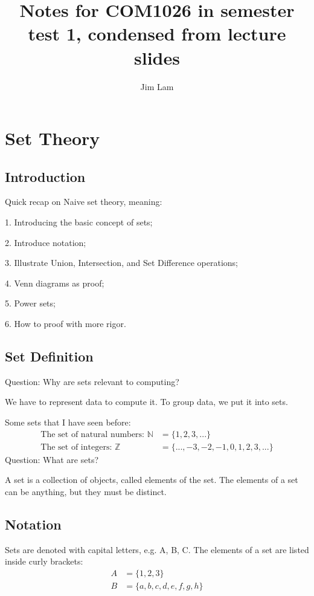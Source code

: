 \documentclass{article}
\author{Jim Lam}
\begin{document}
\title{Notes for COM1026 in semester test 1, condensed from lecture slides}
\maketitle
\tableofcontents
\section{Set Theory}

\subsection{Introduction}
Quick recap on Naive set theory, meaning:

1. Introducing the basic concept of sets;

2. Introduce notation;

3. Illustrate Union, Intersection, and Set Difference operations;

4. Venn diagrams as proof;

5. Power sets;

6. How to proof with more rigor.

\subsection{Set Definition}

Question: Why are sets relevant to computing?

We have to represent data to compute it.
To group data, we put it into sets.

Some sets that I have seen before:
\begin{align*}
    \text{The set of natural numbers: } \mathbb{N} & = \{1, 2, 3, ...\}                    \\
    \text{The set of integers: } \mathbb{Z}        & = \{..., -3, -2, -1, 0, 1, 2, 3,...\}
\end{align*}
Question: What are sets?


A set is a collection of objects, called elements of the set. The elements of a set can be anything, but they must be distinct.

\subsection{Notation}
Sets are denoted with capital letters, e.g. A, B, C. The elements of a set are listed inside curly brackets:
\begin{align*}
    A & = \{1, 2, 3\}                \\
    B & = \{a, b, c, d, e, f, g, h\}
\end{align*}
\end{document}
